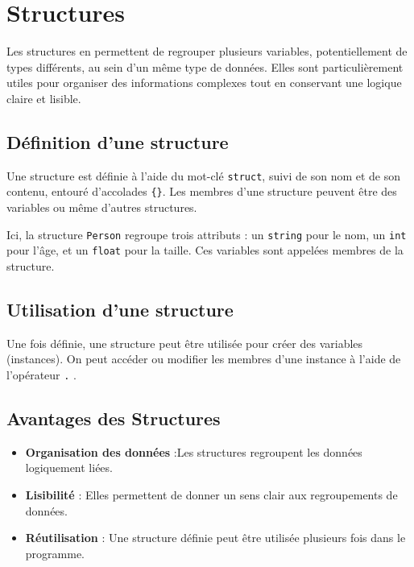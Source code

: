 \chapter{Structures}

Les structures en \cpp permettent de regrouper plusieurs variables, potentiellement de types différents, au sein d’un même type de données. Elles sont particulièrement utiles pour organiser des informations complexes tout en conservant une logique claire et lisible.

\section{Définition d'une structure}

Une structure est définie à l'aide du mot-clé \lstinline|struct|, suivi de son nom et de son contenu, entouré d’accolades \lstinline|{}|. Les membres d'une structure peuvent être des variables ou même d'autres structures.



Ici, la structure \lstinline|Person| regroupe trois attributs : un \lstinline|string| pour le nom, un \lstinline|int| pour l'âge, et un \lstinline|float| pour la taille. Ces variables sont appelées membres de la structure.

\section{Utilisation d'une structure}

Une fois définie, une structure peut être utilisée pour créer des variables (instances). On peut accéder ou modifier les membres d'une instance à l’aide de l’opérateur \lstinline|.| .



\section{Avantages des Structures}

\begin{itemize}
	\item \textbf{Organisation des données} :Les structures regroupent les données logiquement liées.
	\item \textbf{Lisibilité} : Elles permettent de donner un sens clair aux regroupements de données.
	\item \textbf{Réutilisation} : Une structure définie peut être utilisée plusieurs fois dans le programme.
\end{itemize}